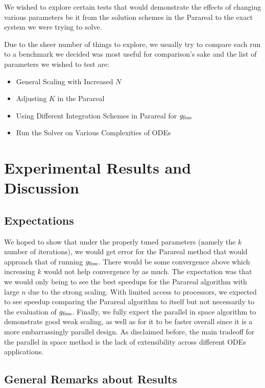 \documentclass[letterpaper,12pt]{article}
\begin{document}
We wished to explore certain tests that would demonstrate the effects of changing various parameters be it from the solution schemes in the Parareal to the exact system we were trying to solve.

Due to the sheer number of things to explore, we usually try to compare each run to a benchmark we decided was most useful for comparison's sake and the list of parameters we wished to test are:

\begin{itemize}
\item General Scaling with Increased $N$
\item Adjusting $K$ in the Parareal
\item Using Different Integration Schemes in Parareal for $g_{\textnormal{fine}}$
\item Run the Solver on Various Complexities of ODEs
\end{itemize}

\section{Experimental Results and Discussion}

\subsection{Expectations}
We hoped to show that under the properly tuned parameters (namely the $k$ number
of iterations), we would get error for the Parareal method that would approach
that of running $g_{\textnormal{fine}}$. There would be some convergence above
which increasing $k$ would not help convergence by as much. The expectation was
that we would only being to see the best speedups for the Parareal algorithm
with large $n$ due to the strong scaling. With limited access to processors, we
expected to see speedup comparing the Parareal algorithm to itself but not
necessarily to the evaluation of $g_{\textnormal{fine}}$. Finally, we fully
expect the parallel in space algorithm to demonstrate good weak scaling, as well
as for it to be faster overall since it is a more embarrassingly parallel design.
As disclaimed before, the main tradeoff for the parallel in space method is the
lack of extensibility across different ODEs applications.

\subsection{General Remarks about Results}
\end{document}
